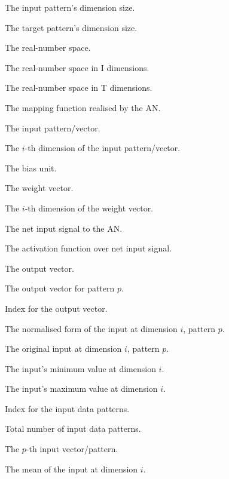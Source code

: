 \begin{description}
	\item [\parbox{2cm}{$I$}] The input pattern's dimension size.
	\item [\parbox{2cm}{$T$}] The target pattern's dimension size.
	\item [\parbox{2cm}{$\mathbb{R}$}] The real-number space.
	\item [\parbox{2cm}{$\mathbb{R}^{I}$}] The real-number space in I dimensions.
	\item [\parbox{2cm}{$\mathbb{R}^{T}$}] The real-number space in T dimensions.
	\item [\parbox{2cm}{$f_{AN}$}] The mapping function realised by the \acs{AN}.
	\item [\parbox{2cm}{$\boldsymbol{x}$}] The input pattern/vector.
	\item [\parbox{2cm}{$x_{i}$}] The $i$-th dimension of the input pattern/vector.
	\item [\parbox{2cm}{$\theta$}] The bias unit.
	\item [\parbox{2cm}{$\boldsymbol{v}$}] The weight vector.
	\item [\parbox{2cm}{$v_{i}$}] The $i$-th dimension of the weight vector.
	\item [\parbox{2cm}{$net$}] The net input signal to the \acs{AN}.
	\item [\parbox{2cm}{$f(net)$}] The activation function over net input signal.
	\item [\parbox{2cm}{$\boldsymbol{y}$}] The output vector.
	\item [\parbox{2cm}{$\boldsymbol{y}_{p}$}] The output vector for pattern $p$.
	\item [\parbox{2cm}{$k$}] Index for the output vector.
	\item [\parbox{2cm}{$x_{i,p}^{'}$}] The normalised form of the input at dimension $i$, pattern $p$.
	\item [\parbox{2cm}{$x_{i,p}$}] The original input at dimension $i$, pattern $p$.
	\item [\parbox{2cm}{$x_{i_{min}}$}] The input's minimum value at dimension $i$.
	\item [\parbox{2cm}{$x_{i_{max}}$}] The input's maximum value at dimension $i$.
	\item [\parbox{2cm}{$p$}] Index for the input data patterns.
	\item [\parbox{2cm}{$P$}] Total number of input data patterns.
	\item [\parbox{2cm}{$\boldsymbol{x}_p$}] The $p$-th input vector/pattern.
	\item [\parbox{2cm}{$\mu_i$}] The mean of the input at dimension $i$.

\end{description}
